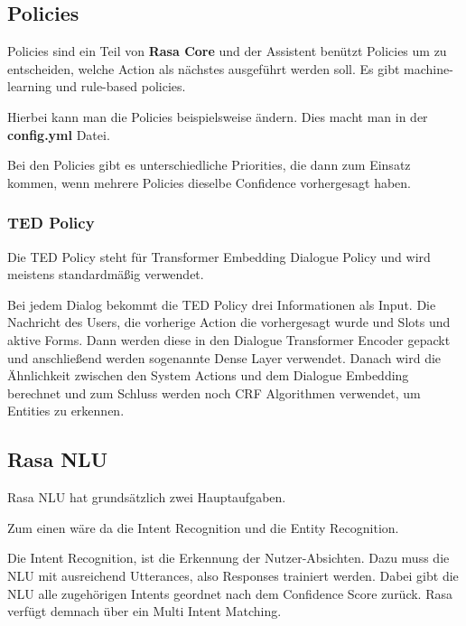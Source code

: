 \subsection{Policies}

Policies sind ein Teil von \textbf{Rasa Core} und der Assistent benützt Policies um zu entscheiden, welche Action als nächstes ausgeführt werden soll.
Es gibt machine-learning und rule-based policies.\cite{policies}

Hierbei kann man die Policies beispielsweise ändern.
Dies macht man in der \textbf{config.yml} Datei.

Bei den Policies gibt es unterschiedliche Priorities, die dann zum Einsatz kommen, wenn mehrere Policies dieselbe Confidence vorhergesagt haben.\cite{policyPriority}

\subsubsection{TED Policy}

Die TED Policy steht für Transformer Embedding Dialogue Policy und wird meistens standardmäßig verwendet.\cite{tedPolicy}

Bei jedem Dialog bekommt die TED Policy drei Informationen als Input.
Die Nachricht des Users, die vorherige Action die vorhergesagt wurde und Slots und aktive Forms.
Dann werden diese in den Dialogue Transformer Encoder gepackt und anschließend werden sogenannte Dense Layer verwendet.
Danach wird die Ähnlichkeit zwischen den System Actions und dem Dialogue Embedding berechnet und zum Schluss werden noch CRF Algorithmen verwendet, um Entities zu erkennen.\cite{tedPolicy}

\subsection{Rasa NLU}

Rasa NLU hat grundsätzlich zwei Hauptaufgaben.

Zum einen wäre da die Intent Recognition und die Entity Recognition.\cite{rasanlu, pretrainedVsSupervised}

Die Intent Recognition, ist die Erkennung der Nutzer-Absichten.
Dazu muss die NLU mit ausreichend Utterances, also Responses trainiert werden.
Dabei gibt die NLU alle zugehörigen Intents geordnet nach dem Confidence Score zurück.
Rasa verfügt demnach über ein Multi Intent Matching.\cite{rasanlu, pretrainedVsSupervised}

